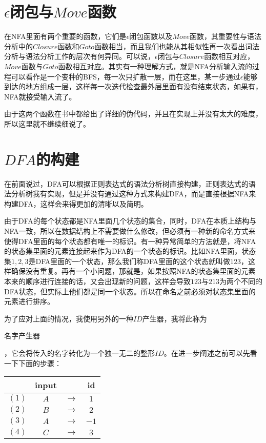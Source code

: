 \section{$\epsilon$闭包与$Move$函数}

在NFA里面有两个重要的函数，它们是$\epsilon$闭包函数以及$Move$函数，其重要性与语法分析中的$Closure$函数和$Goto$函数相当，而且我们也能从其相似性再一次看出词法分析与语法分析工作的层次有何异同。可以说，$\epsilon$闭包与$Closure$函数相互对应，$Move$函数与$Goto$函数相互对应。其实有一种理解方式，就是NFA分析输入流的过程可以看作是一个变种的BFS，每一次只扩散一层，而在这里，某一步通过$\epsilon$能够到达的地方组成一层，这样每一次迭代检查最外层里面有没有结束状态，如果有，NFA就接受输入流了。

由于这两个函数在书中都给出了详细的伪代码，并且在实现上并没有太大的难度，所以这里就不继续细说了。

\section{$DFA$的构建}

在前面说过，DFA可以根据正则表达式的语法分析树直接构建，正则表达式的语法分析树我有实现，但是并没有通过这种方式来构建DFA，而是直接根据NFA来构建DFA，这样会来得更加的清晰以及简明。

由于DFA的每个状态都是NFA里面几个状态的集合，同时，DFA在本质上结构与NFA一致，所以在数据结构上不需要做什么修改，但必须有一种新的命名方式来使得DFA里面的每个状态都有唯一的标识。有一种异常简单的方法就是，将NFA的状态集里面的元素连接起来作为DFA的一个状态的标识。比如NFA里面，状态集${1,2,3}$是DFA里面的一个状态，那么我们称DFA里面的这个状态就叫做$123$，这样确保没有重复。再有一个小问题，那就是，如果按照NFA的状态集里面的元素本来的顺序进行连接的话，又会出现新的问题，这样会导致$123$与$213$为两个不同的DFA状态，但实际上他们都是同一个状态。所以在命名之前必须对状态集里面的元素进行排序。

为了应对上面的情况，我使用另外的一种$ID$产生器，我将此称为\begin{bfseries}名字产生器\end{bfseries}，它会将传入的名字转化为一个独一无二的整形$ID$。在进一步阐述之前可以先看一下下面的步骤：

\begin{center}\begin{tabular}{c|ccc}
          & \bf{input} &             & \bf{id} \\ \hline
    $(1)$ & $A$        & $\rightarrow$ & $1$   \\
    $(2)$ & $B$        & $\rightarrow$ & $2$   \\
    $(3)$ & $A$        & $\rightarrow$ & $-1$  \\
    $(4)$ & $C$        & $\rightarrow$ & $3$   
\end{tabular}\end{center}

